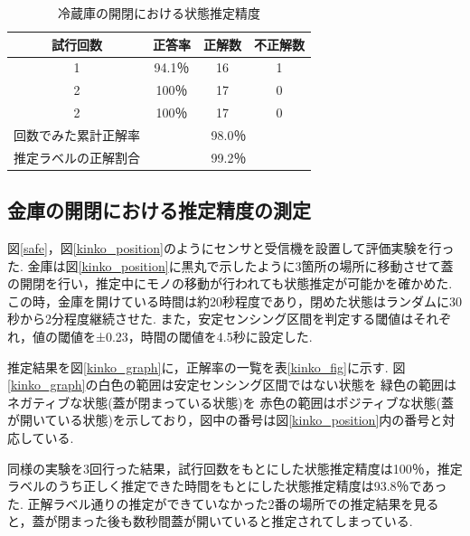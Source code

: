 \documentclass[Japanese]{dicomopapers}
\begin{document}
\begin{table}[tbh]
    \begin{center}
        \caption{冷蔵庫の開閉における状態推定精度}
        \label{refrigerator_fig}
        \begin{tabular}{|c|c|c|c|} \hline
        試行回数 & 正答率 & 正解数 & 不正解数 \\ \hline
        1 & 94.1％ & 16 & 1 \\ \hline
        2 & 100％ & 17 & 0 \\ \hline
        2 & 100％ & 17 & 0 \\ \hline \hline
        回数でみた累計正解率 & \multicolumn{3}{c|}{98.0％} \\ \hline \hline
        推定ラベルの正解割合 & \multicolumn{3}{c|}{99.2％} \\ \hline
        \end{tabular}
    \end{center}
\end{table}



\subsection{金庫の開閉における推定精度の測定}
図\ref{safe}，図\ref{kinko_position}のようにセンサと受信機を設置して評価実験を行った.
金庫は図\ref{kinko_position}に黒丸で示したように3箇所の場所に移動させて蓋の開閉を行い，推定中にモノの移動が行われても状態推定が可能かを確かめた.
この時，金庫を開けている時間は約20秒程度であり，閉めた状態はランダムに30秒から2分程度継続させた.
また，安定センシング区間を判定する閾値はそれぞれ，値の閾値を±0.23，時間の閾値を4.5秒に設定した.

推定結果を図\ref{kinko_graph}に，正解率の一覧を表\ref{kinko_fig}に示す.
図\ref{kinko_graph}の白色の範囲は安定センシング区間ではない状態を 緑色の範囲はネガティブな状態(蓋が閉まっている状態)を 赤色の範囲はポジティブな状態(蓋が開いている状態)を示しており，図中の番号は図\ref{kinko_position}内の番号と対応している.

同様の実験を3回行った結果，試行回数をもとにした状態推定精度は100％，推定ラベルのうち正しく推定できた時間をもとにした状態推定精度は93.8％であった.
正解ラベル通りの推定ができていなかった2番の場所での推定結果を見ると，蓋が閉まった後も数秒間蓋が開いていると推定されてしまっている.
\end{document}
